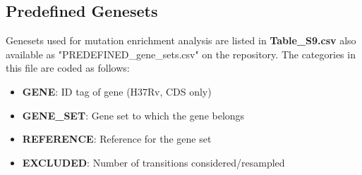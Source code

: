 \documentclass[12pt, oneside]{article}   	%
\begin{document}
\subsection{Predefined Genesets}
Genesets used for mutation enrichment analysis are listed in \textbf{Table\_S9.csv} also available as "PREDEFINED\_gene\_sets.csv" on the repository.
The categories in this file are coded as follows:
\begin{itemize}
\item \textbf{GENE}: ID tag of gene (H37Rv, CDS only)
\item \textbf{GENE\_SET}: Gene set to which the gene belongs
\item \textbf{REFERENCE}: Reference for the gene set
\item \textbf{EXCLUDED}: Number of transitions considered/resampled
\end{itemize}
\end{document}
